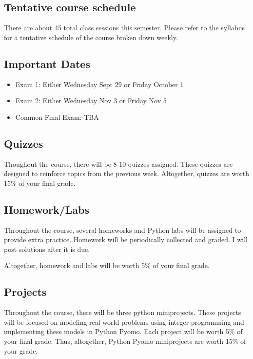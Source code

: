 \documentclass[letterpaper,hidelinks,oneside,11pt]{article}%
\begin{document}
\subsection*{Tentative course schedule} 

There are about 45 total class sessions this semester. Please refer to the syllabus for a tentative schedule of the course broken down weekly.

\subsection*{Important Dates}
\begin{itemize}
\item Exam 1: Either Wednesday Sept 29 or Friday October 1
\item Exam 2: Either Wednesday Nov 3 or Friday Nov 5
\item Common Final Exam: TBA
\end{itemize}

\subsection*{Quizzes}

Thoughout the course, there will be 8-10 quizzes assigned. These quizzes are designed to reinforce topics from the previous week. Altogether, quizzes are worth 15\% of your final grade.


\subsection*{Homework/Labs}

Throughout the course, several homeworks and Python labs will be assigned to provide extra practice. Homework will be periodically collected and graded. I will post solutions after it is due.

Altogether, homework and labs will be worth 5\% of your final grade.

\subsection*{Projects}

Throughout the course, there will be three python miniprojects. These projects will be focused on modeling real world problems using integer programming and implementing these models in Python Pyomo. Each project will be worth 5\% of your final grade. Thus, altogether, Python Pyomo miniprojects are worth 15\% of your grade.
\end{document}

